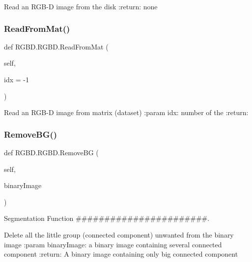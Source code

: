 \begin{DoxyVerb}Read an RGB-D image from the disk
:return: none
\end{DoxyVerb}
 \mbox{\label{class_r_g_b_d_1_1_r_g_b_d_ac7350dc76ae47fdd77c0ad93a74910db}} 
\subsubsection{Read\+From\+Mat()}
{\footnotesize\ttfamily def R\+G\+B\+D.\+R\+G\+B\+D.\+Read\+From\+Mat (\begin{DoxyParamCaption}\item[{}]{self,  }\item[{}]{idx = {\ttfamily -\/1} }\end{DoxyParamCaption})}

\begin{DoxyVerb}Read an RGB-D image from matrix (dataset)
:param idx: number of the
:return:
\end{DoxyVerb}
 \mbox{\label{class_r_g_b_d_1_1_r_g_b_d_ad9260800129b014cc2b56acfe0f1bd0e}} 
\subsubsection{Remove\+B\+G()}
{\footnotesize\ttfamily def R\+G\+B\+D.\+R\+G\+B\+D.\+Remove\+BG (\begin{DoxyParamCaption}\item[{}]{self,  }\item[{}]{binary\+Image }\end{DoxyParamCaption})}



Segmentation Function \#\#\#\#\#\#\#\#\#\#\#\#\#\#\#\#\#\#\#\#\#\#\#. 

\begin{DoxyVerb}Delete all the little group (connected component) unwanted from the binary image
:param binaryImage: a binary image containing several connected component
:return: A binary image containing only big connected component
\end{DoxyVerb}
 \mbox{\label{class_r_g_b_d_1_1_r_g_b_d_a543187dff5889d3aab9f613d1bc95c8f}} 
